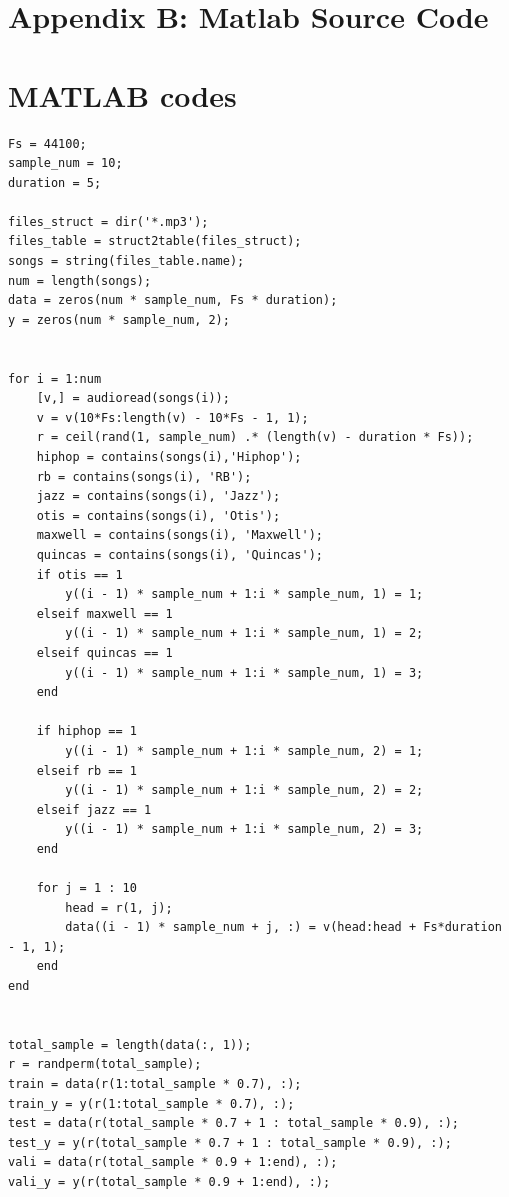 \documentclass[12pt]{article}
\begin{document}
\section{Appendix B: Matlab Source Code}
\section{MATLAB codes}
\begin{verbatim}
Fs = 44100;
sample_num = 10;
duration = 5;

files_struct = dir('*.mp3');
files_table = struct2table(files_struct);
songs = string(files_table.name);
num = length(songs);
data = zeros(num * sample_num, Fs * duration);
y = zeros(num * sample_num, 2); 


for i = 1:num
    [v,] = audioread(songs(i));
    v = v(10*Fs:length(v) - 10*Fs - 1, 1);
    r = ceil(rand(1, sample_num) .* (length(v) - duration * Fs));
    hiphop = contains(songs(i),'Hiphop');
    rb = contains(songs(i), 'RB');
    jazz = contains(songs(i), 'Jazz');
    otis = contains(songs(i), 'Otis');
    maxwell = contains(songs(i), 'Maxwell');
    quincas = contains(songs(i), 'Quincas');
    if otis == 1
        y((i - 1) * sample_num + 1:i * sample_num, 1) = 1;
    elseif maxwell == 1
        y((i - 1) * sample_num + 1:i * sample_num, 1) = 2;
    elseif quincas == 1
        y((i - 1) * sample_num + 1:i * sample_num, 1) = 3;
    end
    
    if hiphop == 1
        y((i - 1) * sample_num + 1:i * sample_num, 2) = 1;
    elseif rb == 1
        y((i - 1) * sample_num + 1:i * sample_num, 2) = 2;
    elseif jazz == 1
        y((i - 1) * sample_num + 1:i * sample_num, 2) = 3;
    end
    
    for j = 1 : 10
        head = r(1, j);
        data((i - 1) * sample_num + j, :) = v(head:head + Fs*duration - 1, 1);
    end
end


total_sample = length(data(:, 1));
r = randperm(total_sample);
train = data(r(1:total_sample * 0.7), :);
train_y = y(r(1:total_sample * 0.7), :);
test = data(r(total_sample * 0.7 + 1 : total_sample * 0.9), :);
test_y = y(r(total_sample * 0.7 + 1 : total_sample * 0.9), :);
vali = data(r(total_sample * 0.9 + 1:end), :);
vali_y = y(r(total_sample * 0.9 + 1:end), :);
\end{verbatim}
\end{document}
